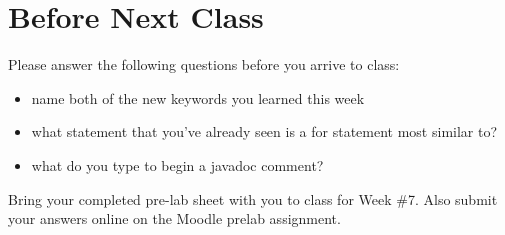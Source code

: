 \section{Before Next Class}

Please answer the following questions before you arrive to class:

\begin{exer}

\begin{itemize}

\item name both of the new keywords you learned this week

  \evalline
  
\item what statement that you've already seen is a for statement most similar to?

  \evalline
  
\item what do you type to begin a javadoc comment?

  \evalline
  
\end{itemize}

\end{exer}

Bring your completed pre-lab sheet with you to class for Week \#7. Also submit your answers online on the Moodle prelab assignment.  

